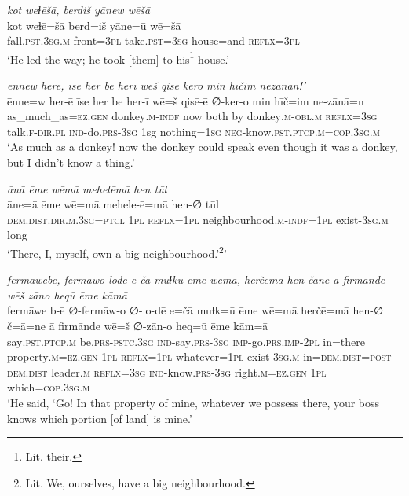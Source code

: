 \ea \label{HB.53}
\textit{kot weɫēšā, berdiš yānew wēšā} \\ 
\gll kot weɫē=šā berd=iš yāne=ū wē=šā \\ 
 fall\textsc{.pst}\textsc{.3sg}\textsc{.m} front\textsc{=3pl} take\textsc{.pst}\textsc{=3sg} house=and \textsc{reflx}\textsc{=3pl} \\ 
\glt `He led the way; he took [them] to his\footnote{Lit. their.} house.'
\z 
 
\ea \label{HB.84}
\textit{ēnnew herē, īse her be herī wēš qisē kero min hīčim nezānān!’} \\ 
\gll ēnne=w her-ē īse her be her-ī wē=š qisē-ē ∅-ker-o min hīč=im ne-zānā=n \\ 
 as\_much\_as\textsc{=ez}\textsc{.gen} donkey\textsc{.m}\textsc{-indf} now both by donkey\textsc{.m}\textsc{-obl}\textsc{.m} \textsc{reflx}\textsc{=3sg} talk\textsc{\textsc{.f}}\textsc{-dir}\textsc{.pl} \textsc{ind-}do\textsc{.prs}\textsc{-3sg} 1sg nothing\textsc{=1sg} \textsc{neg-}know\textsc{.pst}\textsc{.ptcp}\textsc{.m}\textsc{=cop}\textsc{.3sg}\textsc{.m} \\ 
\glt `As much as a donkey! now the donkey could speak even though it was a donkey, but I didn’t know a thing.'
\z 
 
\ea \label{PM.17}
\textit{ānā ēme wēmā mehelēmā hen tūl} \\ 
\gll āne=ā ēme wē=mā mehele-ē=mā hen-∅ tūl \\ 
 \textsc{dem.dist}\textsc{.dir}\textsc{.m}\textsc{.3sg}=\textsc{ptcl} \textsc{1pl} \textsc{reflx}\textsc{=1pl} neighbourhood\textsc{.m}\textsc{-indf}\textsc{=1pl} exist\textsc{-3sg}\textsc{.m} long \\ 
\glt `There, I, myself, own a big neighbourhood.’\footnote{Lit. We, ourselves, have a big neighbourhood.}'
\z 
 
\ea \label{PM.20}
\textit{fermāwebē, fermāwo lodē e čā muɫkū ēme wēmā, herčēmā hen čāne ā firmānde wēš zāno heqū ēme kāmā} \\ 
\gll fermāwe b-ē ∅-fermāw-o ∅-lo-dē e=čā muɫk=ū ēme wē=mā herčē=mā hen-∅ č=ā=ne ā firmānde wē=š ∅-zān-o heq=ū ēme kām=ā \\ 
 say\textsc{.pst}\textsc{.ptcp}\textsc{.m} be\textsc{.prs}\textsc{-pstc}\textsc{.3sg} \textsc{ind-}say\textsc{.prs}\textsc{-3sg} \textsc{imp-}go\textsc{.prs}.\textsc{imp-}\textsc{2pl} in=there property\textsc{.m}\textsc{\textsc{=ez.gen}} \textsc{1pl} \textsc{reflx}\textsc{=1pl} whatever\textsc{=1pl} exist\textsc{-3sg}\textsc{.m} in=\textsc{dem.dist}\textsc{=\textsc{post}} \textsc{dem.dist} leader\textsc{.m} \textsc{reflx}\textsc{=3sg} \textsc{ind-}know\textsc{.prs}\textsc{-3sg} right\textsc{.m}\textsc{\textsc{=ez.gen}} \textsc{1pl} which\textsc{=cop}\textsc{.3sg}\textsc{.m} \\ 
\glt `He said, ‘Go! In that property of mine, whatever we possess there, your boss knows which portion [of land] is mine.'
\z 
 
